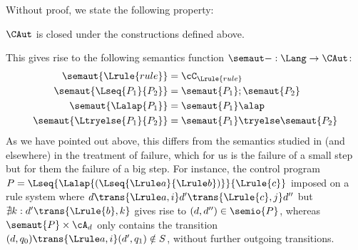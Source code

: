 %
Without proof, we state the following property:
%
\begin{proposition}
$\CAut$ is closed under the constructions defined above.
\end{proposition}
%
This gives rise to the following semantics function $\semaut-: \Lang
\rightarrow \CAut$:
%
\begin{align*}
\semaut{\Lrule{rule}} &= \cC_{\Lrule{rule}} \\
\semaut{\Lseq{P_1}{P_2}} &= \semaut{P_1};\semaut{P_2}\\
\semaut{\Lalap{P_1}} &= \semaut{P_1}\alap\\
\semaut{\Ltryelse{P_1}{P_2}} &= \semaut{P_1} \tryelse \semaut{P_2}
\end{align*}
%
As we have pointed out above, this differs from the semantics studied in
\cite{HabelPlump01} (and elsewhere) in the treatment of failure, which for us
is the failure of a small step but for them the failure of a big step. For
instance, the control program $P=\Lseq{\Lalap{(\Lseq{\Lrule a}{\Lrule
b})}}{\Lrule{c}}$ imposed on a rule system where $d\trans{\Lrule
a,i}d'\trans{\Lrule{c},j}d''$ but $\nexists k:d'\trans{\Lrule{b},k}$ gives rise
to $(d,d'')\in \semio{P}$, whereas $\semaut{P}\times \cA_d$ only contains the
transition $(d,q_0)\trans{\Lrule a,i} (d',q_1)\notin S$, without further
outgoing transitions.


